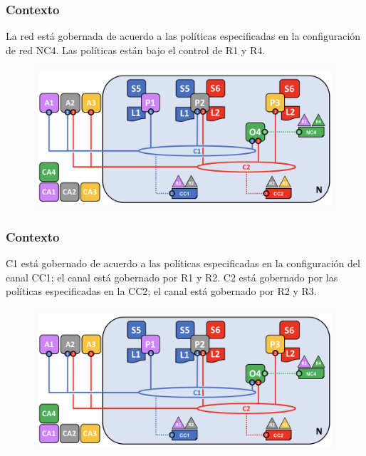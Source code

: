 \documentclass{beamer}
\begin{document}
	\begin{frame}
		\frametitle{Contexto}
		La red está gobernada de acuerdo a las políticas especificadas en la configuración de red NC4. Las políticas están bajo el control de R1 y R4.
		\begin{figure}[h]
			\includegraphics[scale=.3]{start_01}
			\centering
		\end{figure}
	\end{frame}

	\begin{frame}
		\frametitle{Contexto}
		C1 está gobernado de acuerdo a las políticas especificadas en la configuración del canal CC1; el canal está gobernado por R1 y R2. C2 está gobernado por las políticas especificadas en la CC2; el canal está gobernado por R2 y R3.
		\begin{figure}[h]
			\includegraphics[scale=.3]{start_01}
			\centering
		\end{figure}
	\end{frame}
\end{document}
